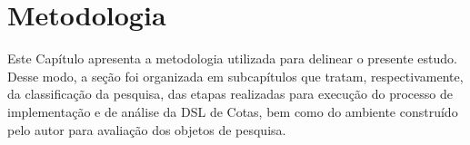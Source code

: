 \chapter{Metodologia}
\label{metodologia}

Este Capítulo apresenta a metodologia utilizada para delinear o presente estudo. Desse modo, a seção foi organizada em subcapítulos que tratam, respectivamente, da classificação da pesquisa, das etapas realizadas para execução do processo de implementação e de análise da DSL de Cotas, bem como do ambiente construído pelo autor para avaliação dos objetos de pesquisa.





 
 

 
 